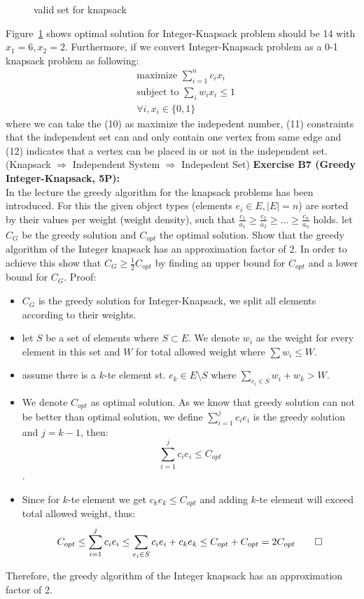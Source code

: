 \documentclass[12pt]{article}
\theoremstyle{definition}
\begin{document}
\begin{flushleft}
\begin{figure}[H]
    \caption{valid set for knapsack}
    \label{fig:knapsack}
\end{figure}
Figure~\ref{fig:knapsack} shows optimal solution for Integer-Knapsack problem should be 14 with $x_1 = 6, x_2 = 2$.
\newline
Furthermore, if we convert Integer-Knapsack problem as a 0-1 knapsack problem as following:
\begin{align}
    &\text{maximize } \sum_{i = 1}^n c_i x_i \\
    & \text{subject to } \sum_i w_i x_i \leq 1\\
    & \forall i, x_i \in \{0, 1\}
\end{align}
where we can take the (10) as maximize the indepedent number, (11) constraints that the independent set can and only contain one vertex from same edge and
(12) indicates that a vertex can be placed in or not in the independent set. (Knapsack $\Longrightarrow$ Independent System $\Longrightarrow$ Indepedent Set)
\newpage
\textbf{Exercise B7 (Greedy Integer-Knapsack, 5P):} \\
In the lecture the greedy algorithm for the knapsack problems has been introduced. For this the given object types 
(elements $e_i \in E, |E| = n$) are sorted by their values per weight (weight density), such that 
$\displaystyle\frac{c_1}{a_1} \geq \frac{c_2}{a_2} \geq \dots \geq \frac{c_n}{a_n}$ holds.
\newline
let $C_G$ be the greedy solution and $C_{opt}$ the optimal solution. Show that the greedy algorithm of 
the Integer knapsack has an approximation factor of 2. In order to achieve this show that 
$C_G \geq \frac{1}{2} C_{opt}$ by finding an upper bound for $C_{opt}$ and a lower bound for $C_G$.
\newline
Proof:
\begin{itemize}
    \item $C_G$ is the greedy solution for Integer-Knapsack, we split all elements according to their weights.
    \item let $S$ be a set of elements where $S \subset E$. We denote $w_i$ as the weight for every element in this set 
    and $W$ for total allowed weight where $\sum w_i \leq W$.
    \item assume there is a $k$-te element st. $e_k \in E \setminus S$ where $\sum_{e_i \in S} w_i + w_k > W$. 
    \item We denote $C_{opt}$ as optimal solution. As we know that greedy solution can not be better than optimal solution,
    we define $\sum_{i = 1}^j c_i e_i$ is the greedy solution and $ j = k - 1$, then: $$\sum_{i = 1}^j c_i e_i \leq C_{opt}$$.
    \item Since for $k$-te element we get $c_k e_k \leq C_{opt}$ and adding $k$-te element will exceed total allowed weight,
    thus: $$C_{opt} \leq \sum_{i = 1}^j c_i e_i \leq \sum_{e_i \in S} c_i e_i + c_k e_k \leq C_{opt} + C_{opt} = 2C_{opt} \qed$$
\end{itemize}
Therefore, the greedy algorithm of the Integer knapsack has an approximation factor of 2.
\end{flushleft}
\end{document}

